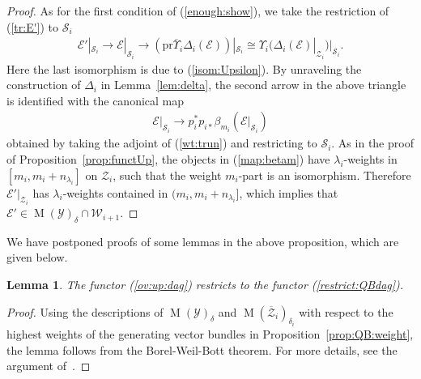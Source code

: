 \documentclass [11pt,oneside,a4paper,mathscr]{amsart}
\newtheorem{lemma}[thm]{Lemma}
\theoremstyle{definition}
\newcommand{\E}{\mathcal{E}}
\newcommand{\Y}{\mathcal{Y}}
\newcommand{\sS}{\mathcal{S}}
\newcommand{\zZ}{\mathcal{Z}}
\newcommand{\MM}{\operatorname{M}}
\newcommand{\ol}{\overline}
\begin{document}
\begin{proof}
As for the first condition of (\ref{enough:show}), we take the restriction of (\ref{tr:E'})
to $\sS_i$ 
\begin{align*}
    \E'|_{\sS_i} \to \E|_{\sS_i} \to (\mathrm{pr}\ol{\Upsilon}_i \Delta_i(\E))|_{\sS_i}
    \cong \Upsilon_i(\Delta_i(\E)|_{\zZ_i})|_{\sS_i}. 
\end{align*}
Here the last isomorphism is due to (\ref{isom:Upsilon}). 
By unraveling the construction of $\Delta_i$ in Lemma~\ref{lem:delta}, the second arrow in the 
above triangle is identified with the canonical map 
\begin{align}\label{map:betam}
    \E|_{\sS_i} \to p_i^{\ast}p_{i\ast}\beta_{m_i}(\E|_{\sS_i})
\end{align}
obtained by taking the adjoint of (\ref{wt:trun}) and restricting to $\mathcal{S}_i$. 
As in the proof of Proposition~\ref{prop:functUp}, the 
objects in (\ref{map:betam}) have $\lambda_i$-weights in 
$[m_i, m_i+n_{\lambda_i}]$ on $\zZ_i$, such that the weight $m_i$-part is an 
isomorphism. 
Therefore $\mathcal{E}'|_{\zZ_i}$ has $\lambda_i$-weights contained in 
$(m_i, m_i+n_{\lambda_i}]$, which implies 
that $\E' \in \MM(\Y)_{\delta} \cap \mathcal{W}_{i+1}$. 
\end{proof}

We have postponed proofs of some lemmas in the above proposition, 
which are given below. 


\begin{lemma}\label{lem:QB:rest}
    The functor (\ref{ov:up:dag}) restricts to the functor (\ref{restrict:QBdag}). 
\end{lemma}
\begin{proof}
    Using the descriptions of $\MM(\mathcal{Y})_{\delta}$ and $\MM(\overline{\mathcal{Z}}_i)_{\delta_i}$ 
    with respect to the highest weights of the generating vector bundles
    in Proposition~\ref{prop:QB:weight}, 
    the lemma follows from the Borel-Weil-Bott theorem. For more details, see the argument of~\cite[Proposition~8.3]{PTtop}. 
\end{proof}
\end{document}
